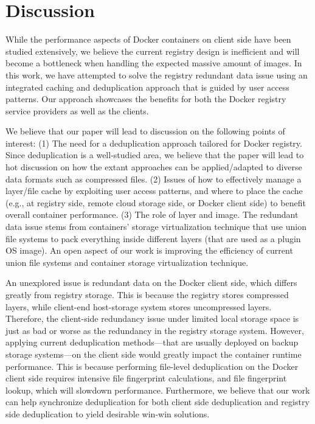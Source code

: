 
\newpage
\section{Discussion}
\label{sec:discussion}
While the performance aspects of Docker containers on client side have been studied extensively,
we believe the current registry design is inefficient and will become 
a bottleneck when handling the expected 
 massive amount of images.
In this work, we have attempted to solve the registry redundant data issue  
using an integrated caching and deduplication approach that is guided by user access patterns. Our approach
showcases the benefits for both the Docker registry service providers as well as the clients.

We believe that our paper will lead to discussion on the following points of interest:
(1) The need for a deduplication approach tailored for Docker registry.
Since deduplication is a well-studied area, we believe that the paper will lead to 
hot discussion on how the extant approaches can be applied/adapted
to diverse data formats such as compressed files.
(2) Issues of how to effectively manage a layer/file cache by exploiting user access patterns, 
and where to place the cache (e.g., at registry side, remote cloud storage side, or Docker client side)
to benefit overall container performance. 
(3) The role of layer and image.
The redundant data issue stems from containers' storage virtualization technique that use
union file systems to pack everything inside different layers (that are used as a plugin OS image).
An open aspect of our work is improving 
the efficiency of current union file systems and container storage virtualization technique.

An unexplored issue is redundant data on the Docker client side, which differs
greatly from registry storage. This is
because the registry stores compressed layers,
while client-end host-storage system stores uncompressed layers.
Therefore, the client-side redundancy issue under limited local storage space is
 just as bad or worse as the redundancy in the registry storage system.
 However, applying current deduplication methods---that are usually deployed on backup storage systems---on
 the client side would greatly impact the container runtime performance. 
 This is because performing file-level deduplication on the Docker client side
 requires intensive file fingerprint calculations, and file fingerprint lookup, 
 which will slowdown performance.
 Furthermore, we believe that our work can help  synchronize deduplication for both
 client side deduplication and registry side deduplication
 to yield desirable win-win solutions.
 
